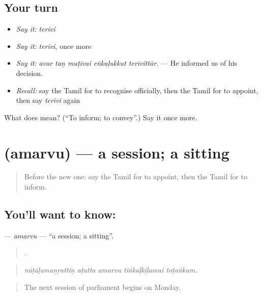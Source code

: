 \subsection*{Your turn}
\begin{itemize}
\raggedright
  \item \emph{Say it:} \emph{terivi}
  \item \emph{Say it:} \emph{terivi}, once more
  \item \emph{Say it:} \emph{avar taṉ muṭivai eṅkaḷukkut terivittār.} — He informed us of his decision.
  \item \emph{Recall:} say the Tamil for to recognise officially, then the Tamil for to appoint, then say \emph{terivi} again
\end{itemize}

\begin{tcolorbox}[breakable,colback=teal!4,colframe=teal!35!black,title={Before you move on}]
What does  mean? (\textquotedblleft{}To inform; to convey\textquotedblright{}.) Say it once more.
\end{tcolorbox}
\section[\texorpdfstring{\ta{அமர்வு} (amarvu)}{அமர்வு (amarvu)}]{ (amarvu) — a session; a sitting}

\label{lesson:TA-C388-amarvu}



\begin{quote}
Before the new one: say the Tamil for to appoint, then the Tamil for to inform.
\end{quote}

\subsection*{You'll want to know: }
\textbf{} — \emph{amarvu} — \textquotedblleft{}a session; a sitting\textquotedblright{}.

\begin{quote}
    .
\end{quote}

\begin{quote}
\emph{nāṭāḷumaṉṟattiṉ aṭutta amarvu tiṅkaḷkiḻamai toṭaṅkum.}
\end{quote}

\begin{quote}
The next session of parliament begins on Monday.
\end{quote}


